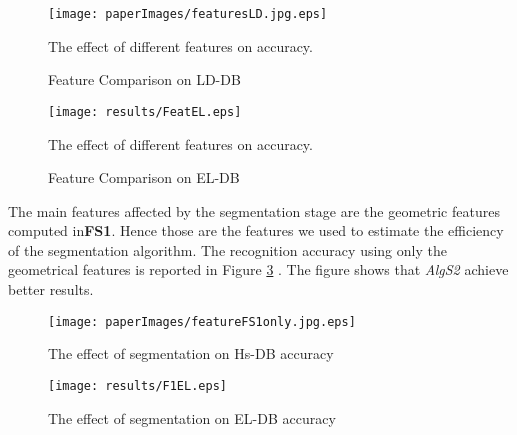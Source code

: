  \begin{figure}
	\centering
		\texttt{[image: paperImages/featuresLD.jpg.eps]}
	\caption{Feature Comparison on LD-DB} The effect of different features on accuracy.  %
	\label{fig:testFeaturesLDDB}
\end{figure}  

 \begin{figure}
	\centering
		\texttt{[image: results/FeatEL.eps]}
	\caption{Feature Comparison on EL-DB} The effect of different features on accuracy.  %
	\label{fig:ELtestFeaturesAll}
\end{figure}  


 The main features affected by the segmentation stage are the geometric features computed in\textbf{FS1}. Hence those are the features we used to estimate the efficiency of the segmentation algorithm. The recognition accuracy using only the geometrical features is reported in Figure \ref{fig:testFeatonly} . The figure shows that \textsl{AlgS2} achieve better results.  %
 \begin{figure}
	\centering
		\texttt{[image: paperImages/featureFS1only.jpg.eps]}
	\caption{The effect of segmentation on Hs-DB accuracy} %
	\label{fig:testFeatonly}
\end{figure}  
 \begin{figure}
	\centering
		\texttt{[image: results/F1EL.eps]}
	\caption{The effect of segmentation on EL-DB accuracy} %
	\label{fig:ELtestFeatonly}
\end{figure}  
